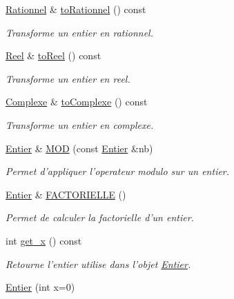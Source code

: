 \begin{DoxyCompactItemize}
\hyperlink{class_l_o21_1_1_rationnel}{\-Rationnel} \& \hyperlink{class_l_o21_1_1_entier_a1039b5ecf2ba82f2f8967d52eb81e2b2}{to\-Rationnel} () const 
\begin{DoxyCompactList}\small\item\em \-Transforme un entier en rationnel. \end{DoxyCompactList}\item 
\hyperlink{class_l_o21_1_1_reel}{\-Reel} \& \hyperlink{class_l_o21_1_1_entier_a1e41e6a2514d7e0b01b8ed6b245fd901}{to\-Reel} () const 
\begin{DoxyCompactList}\small\item\em \-Transforme un entier en reel. \end{DoxyCompactList}\item 
\hyperlink{class_l_o21_1_1_complexe}{\-Complexe} \& \hyperlink{class_l_o21_1_1_entier_abc46eb792359f8dc47785b12837571e3}{to\-Complexe} () const 
\begin{DoxyCompactList}\small\item\em \-Transforme un entier en complexe. \end{DoxyCompactList}\item 
\hyperlink{class_l_o21_1_1_entier}{\-Entier} \& \hyperlink{class_l_o21_1_1_entier_abe27251b6086929c2b2279985e18b752}{\-M\-O\-D} (const \hyperlink{class_l_o21_1_1_entier}{\-Entier} \&nb)
\begin{DoxyCompactList}\small\item\em \-Permet d'appliquer l'operateur modulo sur un entier. \end{DoxyCompactList}\item 
\hyperlink{class_l_o21_1_1_entier}{\-Entier} \& \hyperlink{class_l_o21_1_1_entier_aec2695af3a4a9754ddde3c09a89fda83}{\-F\-A\-C\-T\-O\-R\-I\-E\-L\-L\-E} ()
\begin{DoxyCompactList}\small\item\em \-Permet de calculer la factorielle d'un entier. \end{DoxyCompactList}\item 
int \hyperlink{class_l_o21_1_1_entier_a144f7ad9fd1d1de79503aa647c53d758}{get\-\_\-x} () const 
\begin{DoxyCompactList}\small\item\em \-Retourne l'entier utilise dans l'objet \hyperlink{class_l_o21_1_1_entier}{\-Entier}. \end{DoxyCompactList}\item 
\hyperlink{class_l_o21_1_1_entier_a725b26cfe72bbbbb380a3a6166e7643f}{\-Entier} (int x=0)

\end{DoxyCompactItemize}
